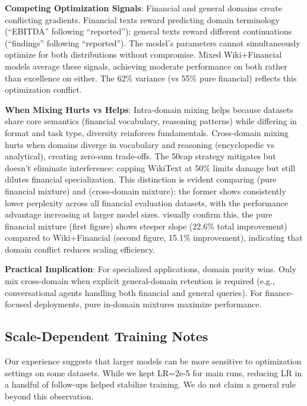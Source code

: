 \textbf{Competing Optimization Signals}: Financial and general domains create conflicting gradients. Financial texts reward predicting domain terminology (``EBITDA'' following ``reported''); general texts reward different continuations (``findings'' following ``reported''). The model's parameters cannot simultaneously optimize for both distributions without compromise. Mixed Wiki+Financial models average these signals, achieving moderate performance on both rather than excellence on either. The 62\% variance (vs 55\% pure financial) reflects this optimization conflict.

\textbf{When Mixing Hurts vs Helps}: Intra-domain mixing helps because datasets share core semantics (financial vocabulary, reasoning patterns) while differing in format and task type, diversity reinforces fundamentals. Cross-domain mixing hurts when domains diverge in vocabulary and reasoning (encyclopedic vs analytical), creating zero-sum trade-offs. The 50cap strategy mitigates but doesn't eliminate interference: capping WikiText at 50\% limits damage but still dilutes financial specialization. This distinction is evident comparing  (pure financial mixture) and  (cross-domain mixture): the former shows consistently lower perplexity across all financial evaluation datasets, with the performance advantage increasing at larger model sizes.  visually confirm this, the pure financial mixture (first figure) shows steeper slope (22.6\% total improvement) compared to Wiki+Financial (second figure, 15.1\% improvement), indicating that domain conflict reduces scaling efficiency.

\textbf{Practical Implication}: For specialized applications, domain purity wins. Only mix cross-domain when explicit general-domain retention is required (e.g., conversational agents handling both financial and general queries). For finance-focused deployments, pure in-domain mixtures maximize performance.

\subsection{Scale-Dependent Training Notes}

Our experience suggests that larger models can be more sensitive to optimization settings on some datasets. While we kept LR=2e-5 for main runs, reducing LR in a handful of follow-ups helped stabilize training. We do not claim a general rule beyond this observation.

